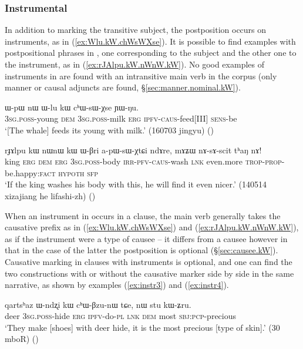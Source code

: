 \subsubsection{Instrumental} \label{sec:instr.kW}
In addition to marking the transitive subject, the postposition  occurs on instruments, as in (\ref{ex:Wlu.kW.chWsWXse}). It is possible to find examples with  postpositional phrases in , one corresponding to the subject and the other one to the instrument, as in (\ref{ex:rJAlpu.kW.nWnW.kW}). No good examples of instruments in  are found with an intransitive main verb in the corpus (only manner or causal adjuncts are found, §\ref{sec:manner.nominal.kW}).

\begin{exe}
\ex \label{ex:Wlu.kW.chWsWXse}
 \gll ɯ-pɯ nɯ ɯ-lu kɯ cʰɯ-sɯ-χse ɲɯ-ŋu. \\
 \textsc{3sg}.\textsc{poss}-young \textsc{dem} \textsc{3sg}.\textsc{poss}-milk \textsc{erg} \textsc{ipfv}-\textsc{caus}-feed[III] \textsc{sens}-be \\
\glt `[The whale] feeds its young with milk.' (160703 jingyu)
()
\end{exe}

\begin{exe}
\ex \label{ex:rJAlpu.kW.nWnW.kW}
 \gll  rɟɤlpu kɯ nɯnɯ kɯ ɯ-βri a-pɯ-sɯ-χtɕi ndɤre, mɤʑɯ nɤ-sɤ-scit tʰaŋ nɤ!\\
 king \textsc{erg} \textsc{dem} \textsc{erg} \textsc{3sg}.\textsc{poss}-body \textsc{irr}-\textsc{pfv}-\textsc{caus}-wash \textsc{lnk} even.more \textsc{trop}-\textsc{prop}-be.happy:\textsc{fact} \textsc{hypoth} \textsc{sfp} \\
 \glt `If the king washes his body with this, he will find it even nicer.' (140514 xizajiang he lifashi-zh)
()
\end{exe}

When an instrument in  occurs in a clause, the main verb generally takes the causative prefix as in (\ref{ex:Wlu.kW.chWsWXse}) and (\ref{ex:rJAlpu.kW.nWnW.kW}), as if the instrument were a type of causee -- it differs from a causee however in that in the case of the latter the postposition  is optional (§\ref{sec:causee.kW}). Causative marking in clauses with  instruments is optional, and one can find the two constructions with or without the causative marker side by side in the same narrative, as shown by examples (\ref{ex:instr3}) and (\ref{ex:instr4}).

\begin{exe} 
\ex \label{ex:instr3}
\gll   qartsʰaz  ɯ-ndʐi kɯ cʰɯ-βzu-nɯ tɕe, nɯ stu kɯ-ʑru.   \\
 deer \textsc{3sg}.\textsc{poss}-hide \textsc{erg} \textsc{ipfv}-do-\textsc{pl} \textsc{lnk} \textsc{dem} most \textsc{sbj}:\textsc{pcp}-precious \\
 \glt   `They make [shoes] with deer hide, it is the most precious [type of skin].' (30 mboR)
()
\end{exe} 

